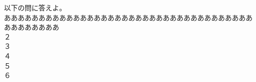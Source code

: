 \documentclass{jarticle}
\begin{document}
\vspace*{\fill}
\begin{center}
以下の問に答えよ。\\
ああああああああああああああああああああああああああああああああああああああああああああ\\
２\\
３\\
４\\
５\\
６
\end{center}
\vspace*{\fill}
\end{document}
